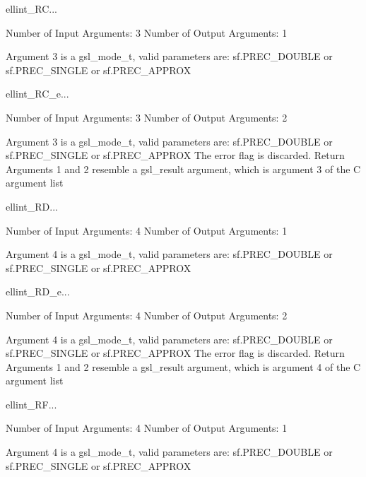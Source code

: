 \begin{funcdesc}{ellint_RC}{...}

    Number of Input  Arguments:  3
    Number of Output Arguments:  1

 Argument 3 is a gsl_mode_t, valid parameters are:
	sf.PREC_DOUBLE or sf.PREC_SINGLE or sf.PREC_APPROX

\end{funcdesc}

\begin{funcdesc}{ellint_RC_e}{...}

    Number of Input  Arguments:  3
    Number of Output Arguments:  2

 Argument 3 is a gsl_mode_t, valid parameters are:
	sf.PREC_DOUBLE or sf.PREC_SINGLE or sf.PREC_APPROX
The error flag is discarded.
Return Arguments 1 and 2 resemble a gsl_result argument,
	which is  argument 3 of the C argument list

\end{funcdesc}

\begin{funcdesc}{ellint_RD}{...}

    Number of Input  Arguments:  4
    Number of Output Arguments:  1

 Argument 4 is a gsl_mode_t, valid parameters are:
	sf.PREC_DOUBLE or sf.PREC_SINGLE or sf.PREC_APPROX

\end{funcdesc}

\begin{funcdesc}{ellint_RD_e}{...}

    Number of Input  Arguments:  4
    Number of Output Arguments:  2

 Argument 4 is a gsl_mode_t, valid parameters are:
	sf.PREC_DOUBLE or sf.PREC_SINGLE or sf.PREC_APPROX
The error flag is discarded.
Return Arguments 1 and 2 resemble a gsl_result argument,
	which is  argument 4 of the C argument list

\end{funcdesc}

\begin{funcdesc}{ellint_RF}{...}

    Number of Input  Arguments:  4
    Number of Output Arguments:  1

 Argument 4 is a gsl_mode_t, valid parameters are:
	sf.PREC_DOUBLE or sf.PREC_SINGLE or sf.PREC_APPROX

\end{funcdesc}

